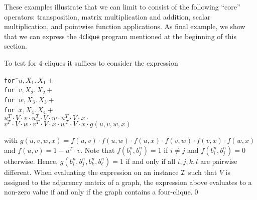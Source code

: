 These examples illustrate that we can limit \langfor to consist of the following ``core'' operators: transposition, matrix multiplication and addition, scalar multiplication, and pointwise function applications.
As final example, we show that we can express the $4\textsf{clique}$ program mentioned at the beginning of this section.
\begin{example}
To test for $4$-cliques it suffices to consider the expression
\begin{tabbing}
\texttt{for }\=$u,X_1.\, X_1 + $\\
\> \texttt{for }\=$v,X_2.\, X_2 +$ \\
\>\>\texttt{for }\=$w,X_3.\, X_3 +$ \\
\>\>\>\texttt{for }\=$x,X_4.\, X_4 +$ \\
\>\>\>\>$u^T\cdot V\cdot v \cdot u^T\cdot V\cdot w\cdot u^T\cdot V\cdot x \cdot $\\
\>\>\>\>$v^T\cdot V\cdot w \cdot v^T\cdot V\cdot x\cdot w^T\cdot V\cdot x \cdot g(u,v,w,x)$\\
\end{tabbing}
with $g(u,v,w,x)=f(u,v)\cdot f(u,w)\cdot f(u,x)\cdot f(v,w)\cdot f(v,x)\cdot f(w,x)$ and
$f(u,v)=1-u^T\cdot v$. Note that $f(b_i^n,b_j^n)=1$ if $i\neq j$ and $f(b_i^n,b_j^n)=0$ otherwise.
Hence, $g(b_i^n,b_j^n,b_k^n,b_\ell^n)=1$ if and only if all $i,j,k,l$ are pairwise different.
When evaluating the expression on an instance $\mathcal{I}$ such that $V$ is assigned to the adjacency 
matrix of a graph, the expression above evaluates to a non-zero value if and only if the graph
contains a four-clique.\qed
\end{example}
%
%


